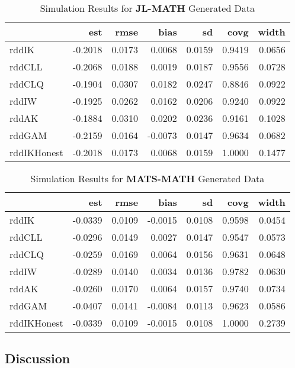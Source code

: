 \documentclass[12pt]{article}
\theoremstyle{definition}
\begin{document}
\begin{table} [ht]
\centering 
\begin{tabular}{lrrrrrr}
\toprule
  & est & rmse & bias & sd & covg & width\\
\midrule
rddIK & -0.2018 & 0.0173 & 0.0068 & 0.0159 & 0.9419 & 0.0656\\
rddCLL & -0.2068 & 0.0188 & 0.0019 & 0.0187 & 0.9556 & 0.0728\\
rddCLQ & -0.1904 & 0.0307 & 0.0182 & 0.0247 & 0.8846 & 0.0922\\
rddIW & -0.1925 & 0.0262 & 0.0162 & 0.0206 & 0.9240 & 0.0922\\
rddAK & -0.1884 & 0.0310 & 0.0202 & 0.0236 & 0.9161 & 0.1028\\
\addlinespace
rddGAM & -0.2159 & 0.0164 & -0.0073 & 0.0147 & 0.9634 & 0.0682\\
rddIKHonest & -0.2018 & 0.0173 & 0.0068 & 0.0159 & 1.0000 & 0.1477\\
\bottomrule
\end{tabular}
\caption{Simulation Results for \textbf{JL-MATH} Generated Data} 
\label{tab:jlmc} 
\end{table} 

\begin{table} [ht]
\centering
\begin{tabular}{lrrrrrr}
\toprule
  & est & rmse & bias & sd & covg & width\\
\midrule
rddIK & -0.0339 & 0.0109 & -0.0015 & 0.0108 & 0.9598 & 0.0454\\
rddCLL & -0.0296 & 0.0149 & 0.0027 & 0.0147 & 0.9547 & 0.0573\\
rddCLQ & -0.0259 & 0.0169 & 0.0064 & 0.0156 & 0.9631 & 0.0648\\
rddIW & -0.0289 & 0.0140 & 0.0034 & 0.0136 & 0.9782 & 0.0630\\
rddAK & -0.0260 & 0.0170 & 0.0064 & 0.0157 & 0.9740 & 0.0734\\
\addlinespace
rddGAM & -0.0407 & 0.0141 & -0.0084 & 0.0113 & 0.9623 & 0.0586\\
rddIKHonest & -0.0339 & 0.0109 & -0.0015 & 0.0108 & 1.0000 & 0.2739\\
\bottomrule
\end{tabular}
\caption{Simulation Results for \textbf{MATS-MATH} Generated Data} 
\label{tab:matsmc} 
\end{table} 

\subsection{Discussion} 
\end{document}
